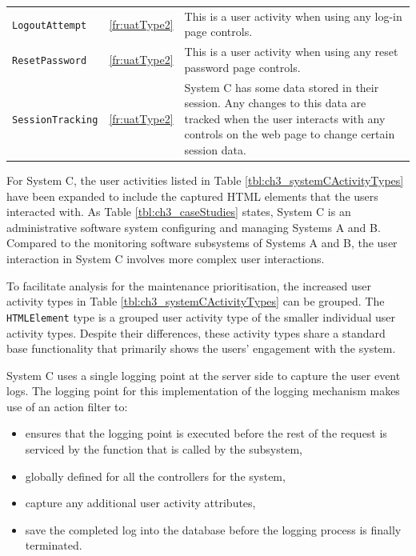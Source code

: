 \begin{table}[!htb]
\begin{tabularx}{\textwidth}{llX}
		\rowcolor{lightgray}
		\texttt{LogoutAttempt} & \ref{fr:uatType2} & \RaggedRight This is a user activity when using any log-in page controls. \\
		\texttt{ResetPassword} & \ref{fr:uatType2} & \RaggedRight This is a user activity when using any reset password page controls. \\
		\rowcolor{lightgray}
		\texttt{SessionTracking} & \ref{fr:uatType2} & \RaggedRight System C has some data stored in their session. Any changes to this data are tracked when the user interacts with any controls on the web page to change certain session data. \\
		\bottomrule
	\end{tabularx}
\end{table}

For System C, the user activities listed in Table \ref{tbl:ch3_systemCActivityTypes} have been expanded to include the captured HTML elements that the users interacted with. As Table \ref{tbl:ch3_caseStudies} states, System C is an administrative software system configuring and managing Systems A and B. Compared to the monitoring software subsystems of Systems A and B, the user interaction in System C involves more complex user interactions.\par To facilitate analysis for the maintenance prioritisation, the increased user activity types in Table \ref{tbl:ch3_systemCActivityTypes} can be grouped. The \texttt{HTMLElement} type is a grouped user activity type of the smaller individual user activity types. Despite their differences, these activity types share a standard base functionality that primarily shows the users' engagement with the system.\par System C uses a single logging point at the server side to capture the user event logs. The logging point for this implementation of the logging mechanism makes use of an action filter to:

\begin{itemize}
	\item ensures that the logging point is executed before the rest of the request is serviced by the function that is called by the subsystem,
	\item globally defined for all the controllers for the system,
	\item capture any additional user activity attributes,
	\item save the completed log into the database before the logging process is finally terminated.
\end{itemize}

